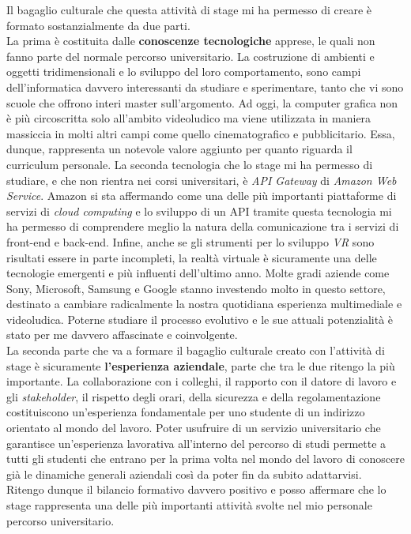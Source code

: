 Il bagaglio culturale che questa attività di stage mi ha permesso di creare è formato sostanzialmente da due parti. \\
La prima è costituita dalle \textbf{conoscenze tecnologiche} apprese, le quali non fanno parte del normale percorso universitario. La costruzione di ambienti e oggetti tridimensionali e lo sviluppo del loro comportamento, sono campi dell'informatica davvero interessanti da studiare e sperimentare, tanto che vi sono scuole che offrono interi master sull'argomento. Ad oggi, la computer grafica non è più circoscritta solo all'ambito videoludico ma viene utilizzata in maniera massiccia in molti altri campi come quello cinematografico e pubblicitario. Essa, dunque, rappresenta un notevole valore aggiunto per quanto riguarda il curriculum personale. La seconda tecnologia che lo stage mi ha permesso di studiare, e che non rientra nei corsi universitari, è \textit{API Gateway} di \textit{Amazon Web Service}. Amazon si sta affermando come una delle più importanti piattaforme di servizi di \textit{cloud computing}\hyperlink{cc}{} e lo sviluppo di un API tramite questa tecnologia mi ha permesso di comprendere meglio la natura della comunicazione tra i servizi di front-end e back-end. Infine, anche se gli strumenti per lo sviluppo \textit{VR} sono risultati essere in parte incompleti, la realtà virtuale è sicuramente una delle tecnologie emergenti e più influenti dell'ultimo anno. Molte gradi aziende come Sony, Microsoft, Samsung e Google stanno investendo molto in questo settore, destinato a cambiare radicalmente la nostra quotidiana esperienza multimediale e videoludica. Poterne studiare il processo evolutivo e le sue attuali potenzialità è stato per me davvero affascinate e coinvolgente. \\
La seconda parte che va a formare il bagaglio culturale creato con l'attività di stage è sicuramente \textbf{l'esperienza aziendale}, parte che tra le due ritengo la più importante. La collaborazione con i colleghi, il rapporto con il datore di lavoro e gli \textit{stakeholder}\hyperlink{sh}{}, il rispetto degli orari, della sicurezza e della regolamentazione costituiscono un'esperienza fondamentale per uno studente di un indirizzo orientato al mondo del lavoro. Poter usufruire di un servizio universitario che garantisce un'esperienza lavorativa all'interno del percorso di studi permette a tutti gli studenti che entrano per la prima volta nel mondo del lavoro di conoscere già le dinamiche generali aziendali così da poter fin da subito adattarvisi. \\
Ritengo dunque il bilancio formativo davvero positivo e posso affermare che lo stage rappresenta una delle più importanti attività svolte nel mio personale percorso universitario.

